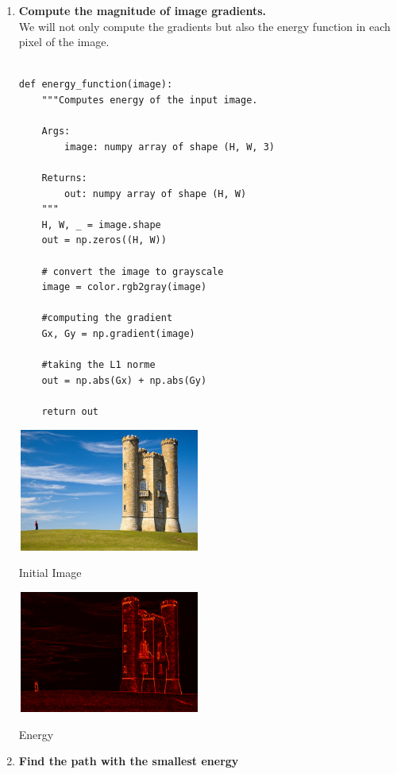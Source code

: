 \documentclass[a4paper, nobib]{tufte-handout}
\begin{document}
\begin{enumerate}
  \item \textbf{Compute the magnitude of image gradients.}\\
    We will not only compute the gradients but also the energy function in
    each pixel of the image.
      \begin{verbatim}

def energy_function(image):
    """Computes energy of the input image.

    Args:
        image: numpy array of shape (H, W, 3)

    Returns:
        out: numpy array of shape (H, W)
    """
    H, W, _ = image.shape
    out = np.zeros((H, W))

    # convert the image to grayscale
    image = color.rgb2gray(image)
    
    #computing the gradient
    Gx, Gy = np.gradient(image)

    #taking the L1 norme
    out = np.abs(Gx) + np.abs(Gy)

    return out
      \end{verbatim}

\begin{marginfigure}
  \centering
  \includegraphics[width=6cm, height=4cm]{imgs/broadway_tower.jpg}
  \caption{Initial Image}
\end{marginfigure}

\begin{marginfigure}
  \centering
  \includegraphics[width=6cm, height=4cm]{./broad_way_energy.png}
  \caption{Energy}
\end{marginfigure}
\item \textbf{Find the path with the smallest energy}


\end{enumerate}
\end{document}
